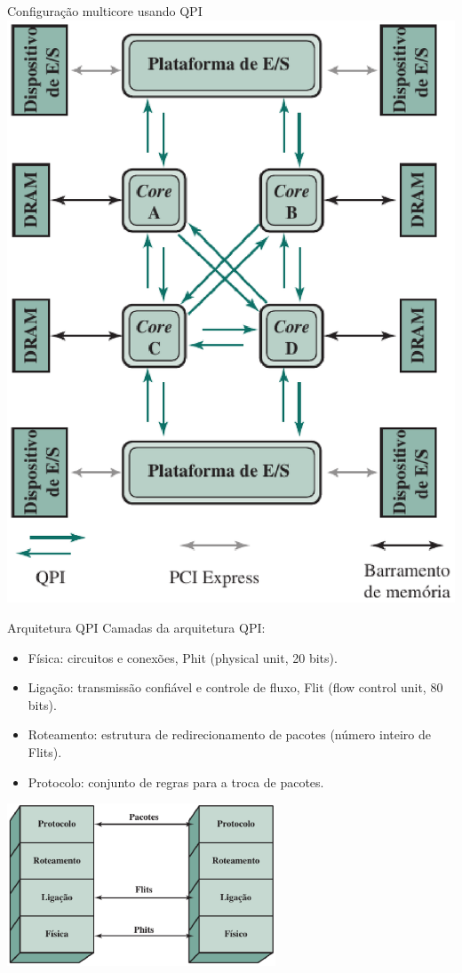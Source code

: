 \begin{slide}{Configuração multicore usando QPI}
	\centering
	\includegraphics[height=0.8\textheight]{figs/3-17}
\end{slide}

\begin{slide}{Arquitetura QPI}
	Camadas da arquitetura QPI:
	\begin{itemize}
		\item Física: circuitos e conexões, Phit (physical unit, 20 bits).
		\item Ligação: transmissão confiável e controle de fluxo, Flit (flow control unit, 80 bits).
		\item Roteamento: estrutura de redirecionamento de pacotes (número inteiro de Flits).
		\item Protocolo: conjunto de regras para a troca de pacotes.
	\end{itemize}
   \centering
   \includegraphics[width=0.6\textwidth]{figs/3-18}
\end{slide}


